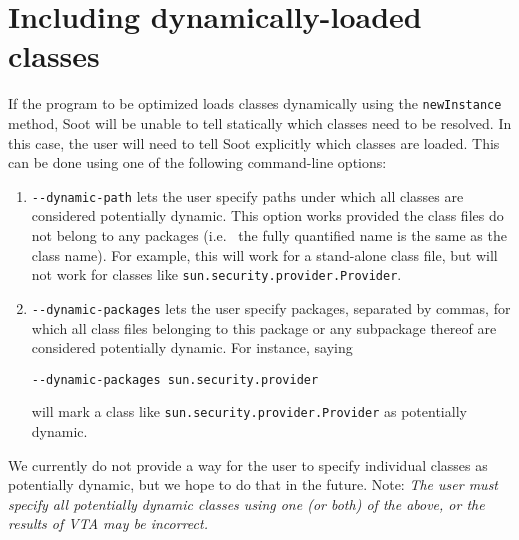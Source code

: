 \documentclass{article}
\begin{document}
\section{Including dynamically-loaded classes}
If the program to be optimized loads classes dynamically using the {\tt newInstance} method, Soot will be
unable to tell statically which classes need to be resolved. In this case, the user will need to tell Soot
explicitly which classes are loaded. This can be done using one of the following command-line options:
\begin{enumerate}
\item {\tt -}{\tt -dynamic-path} lets the user specify paths under which all classes are considered potentially
dynamic. This option works provided the class files do not belong to any packages (i.e.~ the fully quantified
name is the same as the class name). For example, this will work for a stand-alone class file, but will not
work for classes like {\tt sun.security.provider.Provider}.
\item {\tt -}{\tt -dynamic-packages} lets the user specify packages, separated by commas,
for which all class files belonging to this package
or any subpackage thereof are considered potentially dynamic. For instance, saying 
\begin{verbatim}--dynamic-packages sun.security.provider\end{verbatim}
will mark a class like {\tt sun.security.provider.Provider} as potentially dynamic.
\end{enumerate}
We currently do not provide a way for the user to specify individual classes as potentially dynamic, but we hope
to do that in the future. 
Note: \textit{The user must specify all potentially dynamic classes using one (or both) of the above, or the results
of VTA may be incorrect.} 
\end{document}

